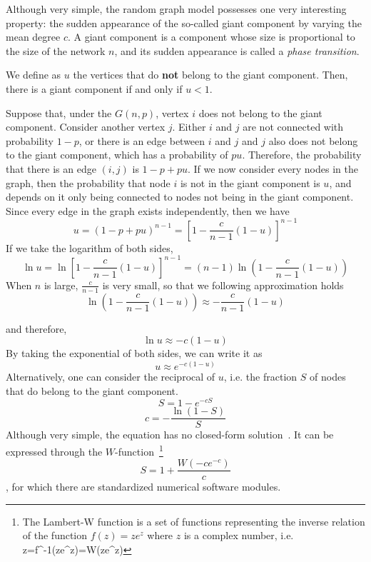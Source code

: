 Although very simple, the random graph model possesses one very interesting property: the sudden appearance of the so-called giant component by varying the mean degree $c$.
A giant component is a component whose size is proportional to the size of the network $n$, and its sudden appearance is called a \textit{phase transition}.

We define as $u$ the vertices that do \textbf{not} belong to the giant component.
Then, there is a giant component if and only if $u<1$.

Suppose that, under the $G(n,p)$, vertex $i$ does not belong to the giant component.
Consider another vertex $j$.
Either $i$ and $j$ are not connected with probability $1-p$, or there is an edge between $i$ and $j$ and $j$ also does not belong to the giant component, which has a probability of $pu$.
Therefore, the probability that there is an edge $(i,j)$ is $1-p + pu$.
If we now consider every nodes in the graph, then the probability that node $i$ is not in the giant component is $u$, and depends on it only being connected to nodes not being in the giant component.
Since every edge in the graph exists independently, then we have
\begin{equation}
	u = (1- p + pu)^{n-1} = \left[ 1 - \frac{c}{n-1} (1-u)\right]^{n-1}
\end{equation}
If we take the logarithm of both sides, 
\begin{equation}
	\ln u = \ln\left[ 1 - \frac{c}{n-1} (1-u)\right]^{n-1} = (n-1) \ln\left( 1-\frac{c}{n-1} (1-u)\right)
\end{equation}
When $n$ is large, $\frac{c}{n-1}$ is very small, so that we following approximation holds
\begin{equation}
	\ln\left( 1-\frac{c}{n-1} (1-u)\right) \approx - \frac{c}{n-1} (1-u)
\end{equation}

and therefore,
\begin{equation}
	\ln u \approx - c (1-u)
\end{equation}
By taking the exponential of both sides, we can write it as
\begin{equation}
	u \approx e^{-c(1-u)}
\end{equation}
Alternatively, one can consider the reciprocal of $u$, i.e. the fraction $S$ of nodes that do belong to the giant component.
\begin{equation}
	S = 1 - e^{-cS}
\end{equation}
\begin{equation}
	c = - \frac{\ln(1-S)}{S}
\end{equation}
\noindent Although very simple, the equation has no closed-form solution~\cite{newman2010networks}.
It can be expressed through the \Lambert $W$-function~\footnote{The Lambert-W function is a set of functions representing the inverse relation of the function $f(z) = z e^{z}$ where $z$ is a complex number, i.e. {\displaystyle\, z=f^{-1}(ze^{z})=W(ze^{z})}}
\begin{equation}
S = 1 + \frac{W(-c e^{-c})}{c}
\label{eq:s_giant_component_lambert}
\end{equation}
\noindent, for which there are standardized numerical software modules.

